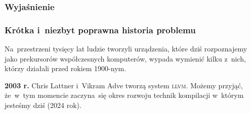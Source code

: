 \documentclass[10pt,t]{beamer}
\begin{document}
\begin{frame}
  \frametitle{Wyjaśnienie }




\end{frame}
















\begin{frame}
  \frametitle{Krótka i~niezbyt poprawna historia problemu}


  Na~przestrzeni tysięcy lat ludzie tworzyli urządzenia, które dziś
  rozpoznajemy jako prekursorów współczesnych komputerów, wypada wymienić
  kilku z~nich, którzy działali przed rokiem 1900-nym.

  \textbf{2003 r.} Chris Lattner i~Vikram Adve tworzą system \textsc{llvm}.
  Możemy przyjąć, że~w~tym momencie zaczyna~się okres rozwoju technik
  kompilacji w~którym jesteśmy dziś (2024 rok).

\end{frame}






\end{document}
